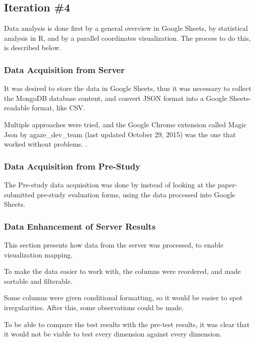 \subsection{Iteration \#4}

Data analysis is done first by a general overview in Google Sheets, by statistical analysis in R, and by a parallel coordinates visualization. The process to do this, is described below.

\subsubsection{Data Acquisition from Server}

It was desired to store the data in Google Sheets, thus it was necessary to collect the MongoDB database content, and convert JSON format into a Google Sheets-readable format, like CSV.

Multiple approaches were tried, and the Google Chrome extension called Magic Json by agaze\_dev\_team (last updated October 29, 2015) %
was the one that worked without problems. \citep{agaze}.

\subsubsection{Data Acquisition from Pre-Study}

The Pre-study data acquisition was done by instead of looking at the paper-submitted pre-study evaluation forms, using the data processed into Google Sheets.

\subsubsection{Data Enhancement of Server Results}

This section presents how data from the server was processed, to enable visualization mapping.

To make the data easier to work with, the columns were reordered, and made sortable and filterable.

Some columns were given conditional formatting, so it would be easier to spot irregularities. After this, some observations could be made.


To be able to compare the test results with the pre-test results, it was clear that it would not be viable to test every dimension against every dimension.

